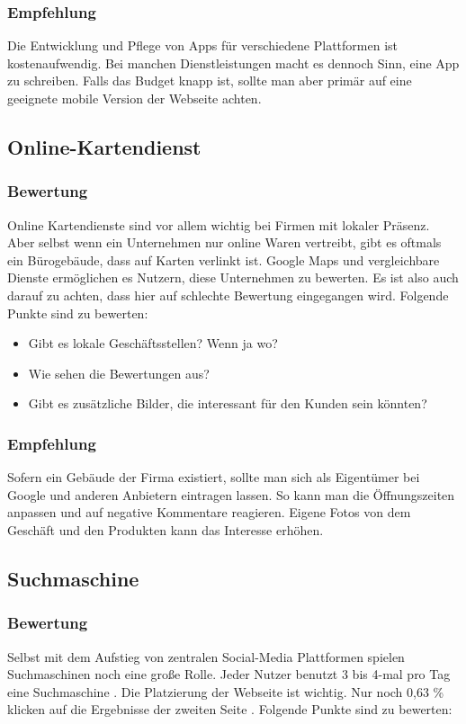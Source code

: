 \subsubsection*{Empfehlung}
Die Entwicklung und Pflege von Apps für verschiedene Plattformen ist kostenaufwendig. Bei manchen Dienstleistungen macht es dennoch Sinn, eine App zu schreiben. Falls das Budget knapp ist, sollte man aber primär auf eine geeignete mobile Version der Webseite achten.


\subsection{Online-Kartendienst}
\subsubsection*{Bewertung}
Online Kartendienste sind vor allem wichtig bei Firmen mit lokaler Präsenz. Aber selbst wenn ein Unternehmen nur online Waren vertreibt, gibt es oftmals ein Bürogebäude, dass auf Karten verlinkt ist. Google Maps und vergleichbare Dienste ermöglichen es Nutzern, diese Unternehmen zu bewerten. Es ist also auch darauf zu achten, dass hier auf schlechte Bewertung eingegangen wird. Folgende Punkte sind zu bewerten:

\begin{itemize}
\item Gibt es lokale Geschäftsstellen? Wenn ja wo?
\item Wie sehen die Bewertungen aus?
\item Gibt es zusätzliche Bilder, die interessant für den Kunden sein könnten?
\end{itemize}
\subsubsection*{Empfehlung}
Sofern ein Gebäude der Firma existiert, sollte man sich als Eigentümer bei Google und anderen Anbietern eintragen lassen. So kann man die Öffnungszeiten anpassen und auf negative Kommentare reagieren. Eigene Fotos von dem Geschäft und den Produkten kann das Interesse erhöhen.

\subsection{Suchmaschine}
\subsubsection*{Bewertung}
Selbst mit dem Aufstieg von zentralen Social-Media Plattformen spielen Suchmaschinen noch eine große Rolle. Jeder Nutzer benutzt 3 bis 4-mal pro Tag eine Suchmaschine \cite{google}. Die Platzierung der Webseite ist wichtig. Nur noch 0,63 \% klicken auf die Ergebnisse der zweiten Seite \cite{google}. Folgende Punkte sind zu bewerten:

